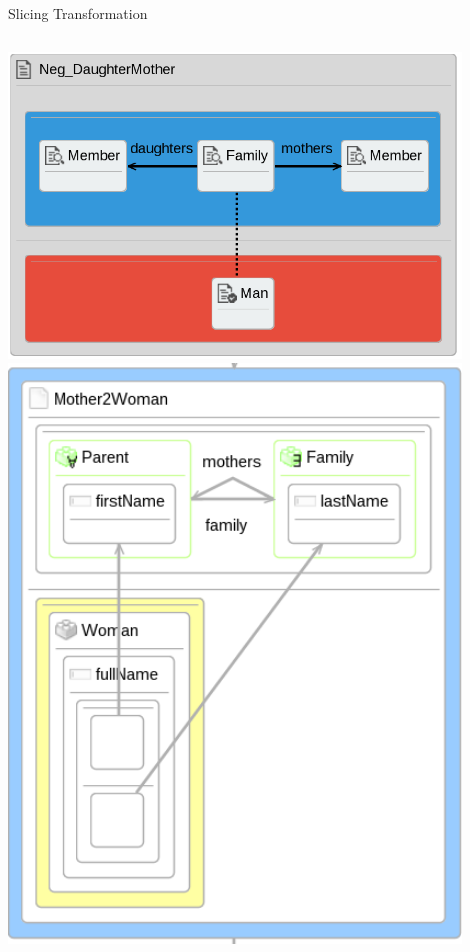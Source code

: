 \documentclass[12pt, handout]{beamer}
\begin{document}
\begin{frame}{Slicing Transformation}
\begin{columns}[T] %
     \begin{column}[T]{0.45\textwidth} %
\includegraphics[width=0.9\textwidth]{figures/Pos_DaughterMother} \newline
\includegraphics[width=0.9\textwidth]{figures/Mother2Woman}

\end{column}
\end{columns}
\end{frame}
\end{document}
